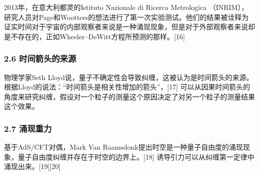 2013年，在意大利都灵的Istituto Nazionale di Ricerca Metrologica （INRIM），研究人员对Page和Wootters的想法进行了第一次实验测试。他们的结果被诠释为证实时间对于宇宙的内部观察者来说是一种涌现现象，但是对于外部观察者来说却是不存在的，正如Wheeler–DeWitt方程所预测的那样。[16]

\subsubsection{2.6 时间箭头的来源}
物理学家Seth Lloyd说，量子不确定性会导致纠缠，这被认为是时间箭头的来源。根据Lloyd的说法：“时间箭头是相关性增加的箭头”，[17] 可以从因果时间箭头的角度来研究纠缠，假设对一个粒子的测量这个原因决定了对另一个粒子的测量结果这个效果。

\subsubsection{2.7 涌现重力}
基于AdS/CFT对偶，Mark Van Raamsdonk提出时空是一种量子自由度的涌现现象，量子自由度纠缠并存在于时空的边界上。[18] 诱导引力可以从纠缠第一定律中涌现出来。[19][20]
